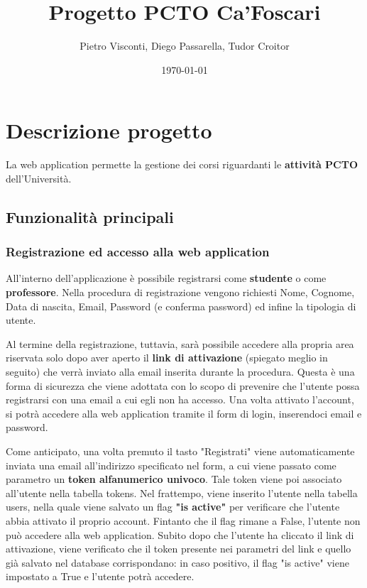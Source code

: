 \documentclass[11pt]{article}
\author{Pietro Visconti, Diego Passarella, Tudor Croitor}
\date{\today}
\title{Progetto PCTO Ca'Foscari}
\begin{document}
\maketitle
\tableofcontents


\section{Descrizione progetto}
\label{sec:org904b230}
La web application permette la gestione dei corsi riguardanti le \textbf{attività PCTO} dell'Università.

\subsection{Funzionalità principali}
\label{sec:org4f39b66}

\subsubsection{Registrazione ed accesso alla web application}
\label{sec:org084020a}
All'interno dell'applicazione è possibile registrarsi come \textbf{studente} o come \textbf{professore}.
Nella procedura di registrazione vengono richiesti Nome, Cognome, Data di nascita, Email, Password (e conferma password) ed infine la tipologia di utente.

Al termine della registrazione, tuttavia, sarà possibile accedere alla propria area riservata solo dopo aver aperto il \textbf{link di attivazione} (spiegato meglio in seguito) che verrà inviato alla email inserita durante la procedura. Questa è una forma di sicurezza che viene adottata con lo scopo di prevenire che l'utente possa registrarsi con una email a cui egli non ha accesso. Una volta attivato l'account, si potrà accedere alla web application tramite il form di login, inserendoci email e password.

Come anticipato, una volta premuto il tasto "Registrati" viene automaticamente inviata una email all'indirizzo specificato nel form, a cui viene passato come parametro un \textbf{token alfanumerico univoco}. Tale token viene poi associato all'utente nella tabella tokens. Nel frattempo, viene inserito l'utente nella tabella users, nella quale viene salvato un flag \textbf{"is active"} per verificare che l'utente abbia attivato il proprio account. Fintanto che il flag rimane a False, l'utente non può accedere alla web application. Subito dopo che l'utente ha cliccato il link di attivazione, viene verificato che il token presente nei parametri del link e quello già salvato nel database corrispondano: in caso positivo, il flag "is active" viene impostato a True e l'utente potrà accedere.
\end{document}
